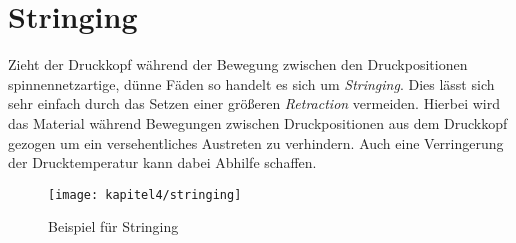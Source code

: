 \clearpage

\section{Stringing}
Zieht der Druckkopf während der Bewegung zwischen den Druckpositionen spinnennetzartige, dünne Fäden so handelt es sich um \textit{Stringing}. Dies lässt sich sehr einfach durch das Setzen einer größeren \textit{Retraction} vermeiden. Hierbei wird das Material während Bewegungen zwischen Druckpositionen aus dem Druckkopf gezogen um ein versehentliches Austreten zu verhindern. Auch eine Verringerung der Drucktemperatur kann dabei Abhilfe schaffen.

\begin{figure}[h]
  \centering
  \texttt{[image: kapitel4/stringing]}
  \caption{Beispiel für Stringing}
  \label{Kap4:Stringing}
\end{figure}